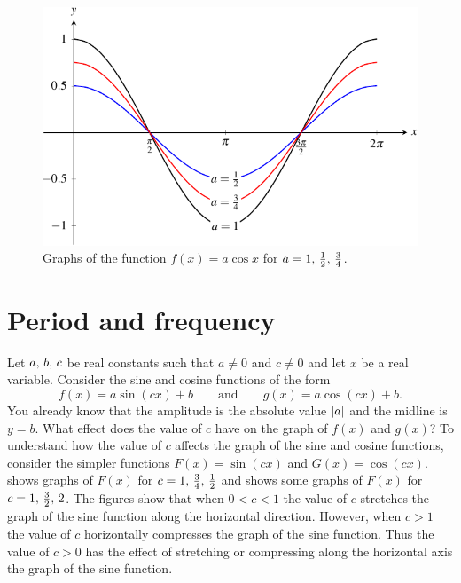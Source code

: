 \documentclass[a4paper,oneside,12pt]{article}
\begin{document}
{\begin{solution}
\begin{figure}[!htbp]
\centering
\includegraphics[scale=1.1]{image/13/cos-vertical-compress.pdf}
\caption{%
  Graphs of the function $f(x) = a \cos x$ for
  $a = {1},\, {\frac{1}{2}},\, {\frac{3}{4}}$.
}
\label{fig:trigonometric:cos_vertical_compress}
\end{figure}

\end{solution}
}{}



\section{Period and frequency}

Let ${a},\, {b},\, {c}$ be real constants such that $a \neq 0$ and
$c \neq 0$ and let $x$ be a real variable.  Consider the sine and
cosine functions of the form
\[
f(x)
=
a \sin(cx) + b
\qquad
\text{and}
\qquad
g(x)
=
a \cos(cx) + b.
\]
You already know that the amplitude is the absolute value
$\lvert a\rvert$ and the midline is $y = b$.  What effect does the
value of $c$ have on the graph of $f(x)$ and $g(x)$?  To understand
how the value of $c$ affects the graph of the sine and cosine
functions, consider the simpler functions $F(x) = \sin(cx)$ and
$G(x) = \cos(cx)$.
 shows graphs of
$F(x)$ for $c = {1},\, {\frac{3}{4}},\, {\frac{1}{2}}$ and
 shows some
graphs of $F(x)$ for $c = {1},\, {\frac{3}{2}},\, {2}$.  The figures
show that when $0 < c < 1$ the value of $c$ stretches the graph of the
sine function along the horizontal direction.  However, when $c > 1$
the value of $c$ horizontally compresses the graph of the sine
function.  Thus the value of $c > 0$ has the effect of stretching or
compressing along the horizontal axis the graph of the sine function.
\end{document}
